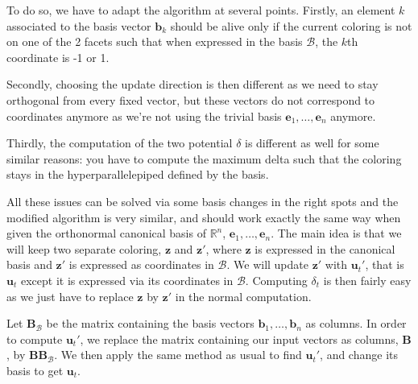 \documentclass[12pt]{article}
\begin{document}
To do so, we have to adapt the algorithm at several points. Firstly, an element $k$ associated to the basis vector $\textbf{b}_k$ should be alive only if the current coloring is not on one of the 2 facets such that when expressed in the basis $\mathcal{B}$, the $k$th coordinate is -1 or 1. 

Secondly, choosing the update direction is then different as we need to stay orthogonal from every fixed vector, but these vectors do not correspond to coordinates anymore as we're not using the trivial basis $\textbf{e}_1,\dots,\textbf{e}_n$ anymore.

Thirdly, the computation of the two potential $\delta$ is different as well for some similar reasons: you have to compute the maximum delta such that the coloring stays in the hyperparallelepiped defined by the basis.

All these issues can be solved via some basis changes in the right spots and the modified algorithm is very similar, and should work exactly the same way when given the orthonormal canonical basis of $\mathbb{R}^n$, $\textbf{e}_1,\dots,\textbf{e}_n$. The main idea is that we will keep two separate coloring, $\textbf{z}$ and $\textbf{z}'$, where $\textbf{z}$ is expressed in the canonical basis and $\textbf{z}'$ is expressed as coordinates in $\mathcal{B}$. We will update $\textbf{z}'$ with $\textbf{u}_t'$, that is $\textbf{u}_t$ except it is expressed via its coordinates in $\mathcal{B}$. Computing $\delta_t$ is then fairly easy as we just have to replace $\textbf{z}$ by $\textbf{z}'$ in the normal computation. 

Let $\textbf{B}_{\mathcal{B}}$ be the matrix containing the basis vectors $\textbf{b}_1,\dots,\textbf{b}_n$ as columns. In order to compute $\textbf{u}_t'$, we replace the matrix containing our input vectors as columns, $\textbf{B}$, by $\textbf{B}\textbf{B}_{\mathcal{B}}$. We then apply the same method as usual to find $\textbf{u}_t'$, and change its basis to get $\textbf{u}_t$.
\end{document}
